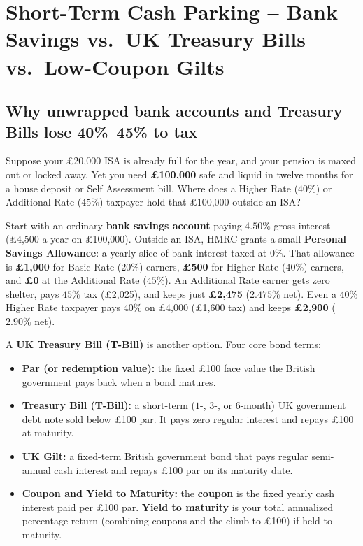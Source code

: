 \section{Short-Term Cash Parking -- Bank Savings vs.\ UK Treasury Bills vs.\ Low-Coupon Gilts}

\subsection{Why unwrapped bank accounts and Treasury Bills lose 40\%--45\% to tax}

Suppose your \pounds 20,000 ISA is already full for the year, and your pension is maxed out or locked away. Yet you need \textbf{\pounds 100,000} safe and liquid in twelve months for a house deposit or Self Assessment bill. Where does a Higher Rate ($40\%$) or Additional Rate ($45\%$) taxpayer hold that \pounds 100,000 outside an ISA?

Start with an ordinary \textbf{bank savings account} paying $4.50\%$ gross interest (\pounds 4,500 a year on \pounds 100,000). Outside an ISA, HMRC grants a small \textbf{Personal Savings Allowance}: a yearly slice of bank interest taxed at $0\%$. That allowance is \textbf{\pounds 1,000} for Basic Rate ($20\%$) earners, \textbf{\pounds 500} for Higher Rate ($40\%$) earners, and \textbf{\pounds 0} at the Additional Rate ($45\%$). An Additional Rate earner gets zero shelter, pays $45\%$ tax (\pounds 2,025), and keeps just \textbf{\pounds 2,475} (\textbf{$2.475\%$} net). Even a $40\%$ Higher Rate taxpayer pays $40\%$ on \pounds 4,000 (\pounds 1,600 tax) and keeps \textbf{\pounds 2,900} ($2.90\%$ net).

A \textbf{UK Treasury Bill (T-Bill)} is another option. Four core bond terms:
\begin{itemize}
  \item \textbf{Par (or redemption value):} the fixed \pounds 100 face value the British government pays back when a bond matures.
  \item \textbf{Treasury Bill (T-Bill):} a short-term ($1$-, $3$-, or $6$-month) UK government debt note sold below \pounds 100 par. It pays zero regular interest and repays \pounds 100 at maturity.
  \item \textbf{UK Gilt:} a fixed-term British government bond that pays regular semi-annual cash interest and repays \pounds 100 par on its maturity date.
  \item \textbf{Coupon and Yield to Maturity:} the \textbf{coupon} is the fixed yearly cash interest paid per \pounds 100 par. \textbf{Yield to maturity} is your total annualized percentage return (combining coupons and the climb to \pounds 100) if held to maturity.
\end{itemize}

